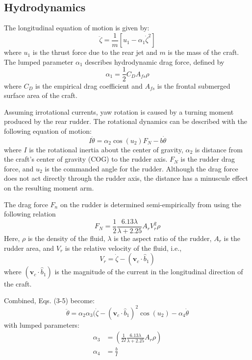 \documentclass[conference]{IEEEtran}
\begin{document}
\subsection{Hydrodynamics}
The longitudinal equation of motion is given by:
\begin{equation}
  \ddot{\zeta} = \frac{1}{m}[u_1 - \alpha_1 \dot{\zeta}^2] 
\end{equation}
where $u_1$ is the thrust force due to the rear jet and $m$ is the mass of the craft. The lumped parameter $\alpha_1$ describes hydrodynamic drag force, defined by
\begin{equation}
  \alpha_1 = \frac{1}{2} C_D A_{fs} \rho
\end{equation}
where $C_D$ is the empirical drag coefficient and $A_{fs}$ is the frontal submerged surface area of the craft.

Assuming irrotational currents, yaw rotation is caused by a turning moment produced by the rear rudder. The rotational dynamics can be described with the following equation of motion:
\begin{equation}
  I \ddot{\theta} = \alpha_2 \cos(u_2) F_N - b \dot{\theta}
\end{equation}
where $I$ is the rotational inertia about the center of gravity, $\alpha_2$ is distance from the craft's center of gravity (COG) to the rudder axis. $F_N$ is the rudder drag force, and $u_2$ is the commanded angle for the rudder. Although the drag force does not act directly through the rudder axis, the distance has a minuscule effect on the resulting moment arm.

The drag force $F_n$ on the rudder is determined semi-empirically from \cite{zelazny2014approximate} using the following relation
\begin{equation}
   F_N = \frac{1}{2} \frac{6.13 \lambda}{\lambda + 2.25} A_r V_r^2 \rho
 \end{equation} 
Here, $\rho$ is the density of the fluid, $\lambda$ is the aspect ratio of the rudder, $A_r$ is the rudder area, and $V_r$ is the relative velocity of the fluid, i.e.,
\begin{equation}
  V_r = \dot{\zeta} - (\bm{v}_{c} \cdot \hat{b}_1)
\end{equation}
where $(\bm{v}_{c} \cdot \hat{b}_1)$ is the magnitude of the current in the longitudinal direction of the craft.

Combined, Eqs. (3-5) become:
\begin{equation}
  \ddot{\theta} = \alpha_2 \alpha_3 (\dot{\zeta} - (\bm{v}_{c} \cdot \hat{b}_1)^2 \cos(u_2) - \alpha_4 \dot{\theta}
\end{equation}
with lumped parameters:
\begin{align}
  \alpha_3 &= \left(\frac{1}{2I} \frac{6.13 \lambda}{\lambda + 2.25} A_r \rho \right) \\
  \alpha_4 &= \frac{b}{I}
\end{align}
\end{document}
